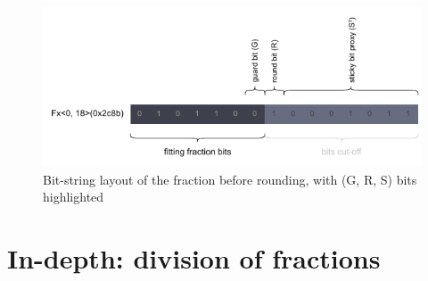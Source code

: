 \begin{figure}
    \begin{center}
    \includegraphics[width=\textwidth]{figures/bits-fraction.drawio.pdf}
    \caption{Bit-string layout of the fraction before rounding, with (G, R, S) bits highlighted}
    \label{fig:fraction_before_rounding}
    \end{center}
\end{figure}


\section{In-depth: division of fractions}\label{Approximated_Algorithms}
